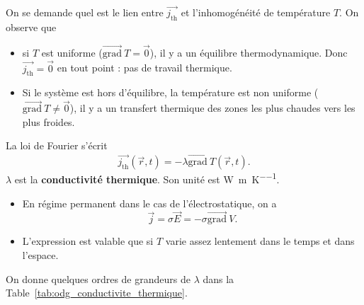         On se demande quel est le lien entre $\vec{j_{\text{th}}}$ et l'inhomogénéité de température $T$. On observe que
        \begin{itemize}
            \item si $T$ est uniforme ($\overrightarrow{\text{grad}}~T=\vec{0}$), il y a un équilibre thermodynamique. Donc $\vec{j_{\text{th}}}=\vec{0}$ en tout point : pas de travail thermique.
            \item Si le système est hors d'équilibre, la température est non uniforme ($\overrightarrow{\text{grad}}~T\neq\vec{0}$), il y a un transfert thermique des zones les plus chaudes vers les plus froides.
        \end{itemize}

        La loi de Fourier s'écrit 
        \begin{equation*}
            \boxed{
                \vec{j_{\text{th}}}(\vec{r},t)=-\lambda\overrightarrow{\text{grad}}~T(\vec{r},t).
            }
        \end{equation*}
        $\lambda$ est la \textbf{conductivité thermique}. Son unité est \si{\watt\per\metre\per\kelvin}.

        \begin{remark}
            \begin{itemize}
                \item En régime permanent dans le cas de l'électrostatique, on a 
                \begin{equation*}
                    \vec{j}=\sigma\vec{E}=-\sigma\overrightarrow{\text{grad}}~V.    
                \end{equation*}
                \item L'expression est valable que si $T$ varie assez lentement dans le temps et dans l'espace.
            \end{itemize}
        \end{remark}

        On donne quelques ordres de grandeurs de $\lambda$ dans la Table~\ref{tab:odg_conductivite_thermique}.

